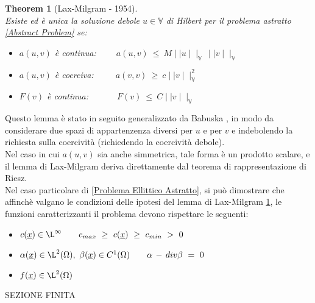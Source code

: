 \documentclass[12pt,a4paper]{report}
\theoremstyle{theorem}
\newtheorem{theorem}{Theorem}[section]
\theoremstyle{definition}
\begin{document}
\begin{theorem} [Lax-Milgram - 1954] \label{Lemma di Lax-Milgram}
\hfill \\
Esiste ed è unica la soluzione debole $u \in \mathbb{V}$ di Hilbert per il problema astratto \ref{Abstract Problem} se:
\begin{itemize}
	\item $a(u,v)$ è continua: $\qquad a(u,v) \ \leq \ M \mid \mid u \mid \mid_{\mathbb{V}} \, \mid \mid v \mid \mid_{\mathbb{V}}$
	\item $a(u,v)$ è coerciva: $\qquad \ a(v,v) \ \geq \ c \mid \mid v \mid  \mid_{\mathbb{V}}^{2}$
	\item $F(v)$ è continua: $\qquad \quad F(v) \ \leq \ C \mid \mid v \mid \mid_{\mathbb{V}}$
\end{itemize}

\end{theorem}
Questo lemma è stato in seguito generalizzato da Babuska \cite{babuska1971BLM}, in modo da considerare due spazi di appartenzenza diversi per $u$ e per $v$ e indebolendo la richiesta sulla coercività (richiedendo la coercività debole).\\
Nel caso in cui $a(u,v)$ sia anche simmetrica, tale forma è un prodotto scalare, e il lemma di Lax-Milgram deriva direttamente dal teorema di rappresentazione di Riesz. \\
Nel caso particolare di \ref{Problema Ellittico Astratto}, si può dimostrare che affinchè valgano le condizioni delle ipotesi del lemma di Lax-Milgram \ref{Lemma di Lax-Milgram}, le funzioni caratterizzanti il problema devono rispettare le seguenti:
\begin{itemize}
	\item $c(\underline{x}) \in \L^{\infty} \qquad c_{max} \ \geq \ c(\underline{x}) \ \geq \ c_{min} \ > \ 0 $
	\item $\alpha(\underline{x}) \in \L^{2}(\Omega), \ \beta(\underline{x}) \in C^{1}(\Omega) \qquad \alpha \, - \, div \beta \ = \ 0$
	\item $f(\underline{x}) \in \L^{2}(\Omega)$
\end{itemize}
{ \color{blue} SEZIONE FINITA\\}
\end{document}
